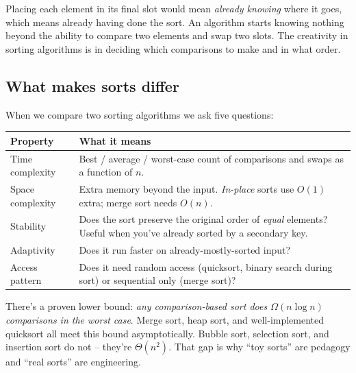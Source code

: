\documentclass[11pt]{article}
\begin{document}
\begin{notebox}
Placing each element in its final slot would mean \emph{already
knowing} where it goes, which means already having done the sort.
An algorithm starts knowing nothing beyond the ability to compare
two elements and swap two slots. The creativity in sorting algorithms
is in deciding which comparisons to make and in what order.
\end{notebox}

\subsection{What makes sorts differ}

When we compare two sorting algorithms we ask five questions:

\begin{center}
\footnotesize
\renewcommand{\arraystretch}{1.3}
\begin{tabular}{@{}p{3.2cm}p{9.2cm}@{}}
\hline
\textbf{Property} & \textbf{What it means} \\
\hline
Time complexity & Best / average / worst-case count of comparisons
                  and swaps as a function of $n$. \\
Space complexity & Extra memory beyond the input. \emph{In-place}
                  sorts use $O(1)$ extra; merge sort needs $O(n)$. \\
Stability       & Does the sort preserve the original order of
                  \emph{equal} elements? Useful when you've already
                  sorted by a secondary key. \\
Adaptivity      & Does it run faster on already-mostly-sorted input? \\
Access pattern  & Does it need random access (quicksort, binary
                  search during sort) or sequential only (merge sort)? \\
\hline
\end{tabular}
\end{center}

\begin{ideabox}
There's a proven lower bound: \emph{any comparison-based sort does
$\Omega(n \log n)$ comparisons in the worst case}. Merge sort, heap
sort, and well-implemented quicksort all meet this bound
asymptotically. Bubble sort, selection sort, and insertion sort do
not -- they're $\Theta(n^2)$. That gap is why ``toy sorts'' are
pedagogy and ``real sorts'' are engineering.
\end{ideabox}
\end{document}
